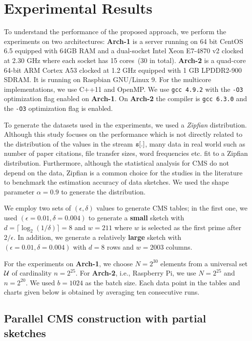 \documentclass[10pt, conference, compsocconf]{IEEEtran}
\begin{document}
\section{Experimental Results}\label{sec:exp}

To understand the performance of the proposed approach, we perform the experiments on two architectures:  {\bf Arch-1} is a server running on 64 bit CentOS 6.5 equipped with 64GB RAM and a dual-socket Intel Xeon E7-4870 v2 clocked at 2.30 GHz where each socket has 15 cores~(30 in total). {\bf Arch-2} is a quad-core 64-bit ARM Cortex A53 clocked at 1.2 GHz equipped with 1 GB LPDDR2-900 SDRAM. It is running on Raspbian GNU/Linux 9. For the multicore implementations, we use C++11 and OpenMP. We use {\tt gcc 4.9.2} with the {\tt -O3} optimization flag enabled on {\bf Arch-1}. On {\bf Arch-2} the compiler is {\tt gcc 6.3.0} and the {\tt -O3} optimization flag is enabled.

To generate the datasets used in the experiments, we used a {\em Zipfian} distribution. Although this study focuses on the performance which is not directly related to the distribution of the values in the stream ${\tt s}[.]$, many data in real world such as number of paper citations, file transfer sizes, word frequencies etc. fit to a Zipfian distribution. Furthermore, although the statistical analysis for CMS do not depend on the data, Zipfian is a common choice for the studies in the literature to benchmark the estimation accuracy of data sketches. We used the shape parameter $\alpha = 0.9$ to generate the distribution. 

We employ two sets of $(\epsilon, \delta)$ values to generate CMS tables; in the first one, we used $(\epsilon = 0.01, \delta = 0.004)$ to generate a {\bf small} sketch with $d = \lceil \log_2(1/\delta) \rceil = 8$ and $w = 211$ where $w$ is selected as the first prime after $2/\epsilon$. In addition, we generate a relatively {\bf large} sketch with $(\epsilon = 0.01, \delta = 0.004)$ with $d = 8$ rows and $w = 2003$ columns. 

For the experiments on {\bf Arch-1}, we choose $N = 2^{30}$ elements from a universal set $\cal U$ of cardinality $n = 2^{25}$. For {\bf Arch-2}, i.e., Raspberry Pi, we use $N = 2^{25}$ and $n = 2^{20}$. We used $b = 1024$ as the batch size. Each data point in the tables and charts given below is obtained by averaging ten consecutive runs. 

\subsection{Parallel CMS construction with partial sketches}
\end{document}
